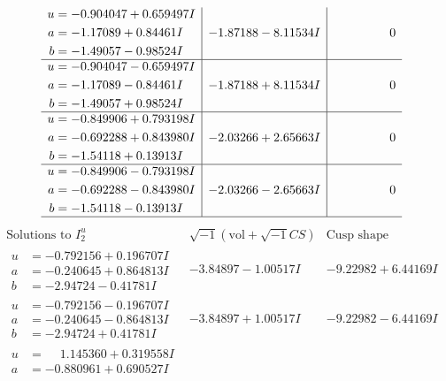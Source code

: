 \documentclass[1p]{elsarticle_modified}
\theoremstyle{definition}
\newcommand{\I}{\sqrt{-1}}
\begin{document}
$$\begin{array}{c|c|c}
\begin{aligned}
u &= -0.904047 + 0.659497 I \\
a &= -1.17089 + 0.84461 I \\
b &= -1.49057 - 0.98524 I\end{aligned}
 & -1.87188 - 8.11534 I & \phantom{-0.000000 } 0 \\ \hline\begin{aligned}
u &= -0.904047 - 0.659497 I \\
a &= -1.17089 - 0.84461 I \\
b &= -1.49057 + 0.98524 I\end{aligned}
 & -1.87188 + 8.11534 I & \phantom{-0.000000 } 0 \\ \hline\begin{aligned}
u &= -0.849906 + 0.793198 I \\
a &= -0.692288 + 0.843980 I \\
b &= -1.54118 + 0.13913 I\end{aligned}
 & -2.03266 + 2.65663 I & \phantom{-0.000000 } 0 \\ \hline\begin{aligned}
u &= -0.849906 - 0.793198 I \\
a &= -0.692288 - 0.843980 I \\
b &= -1.54118 - 0.13913 I\end{aligned}
 & -2.03266 - 2.65663 I & \phantom{-0.000000 } 0\\
 \hline 
 \end{array}$$\newpage$$\begin{array}{c|c|c}  
\text{Solutions to }I^u_{2}& \I (\text{vol} + \sqrt{-1}CS) & \text{Cusp shape}\\
 \hline 
\begin{aligned}
u &= -0.792156 + 0.196707 I \\
a &= -0.240645 + 0.864813 I \\
b &= -2.94724 - 0.41781 I\end{aligned}
 & -3.84897 - 1.00517 I & -9.22982 + 6.44169 I \\ \hline\begin{aligned}
u &= -0.792156 - 0.196707 I \\
a &= -0.240645 - 0.864813 I \\
b &= -2.94724 + 0.41781 I\end{aligned}
 & -3.84897 + 1.00517 I & -9.22982 - 6.44169 I \\ \hline\begin{aligned}
u &= \phantom{-}1.145360 + 0.319558 I \\
a &= -0.880961 + 0.690527 I \\

\end{aligned}
\end{array}$$
\end{document}
